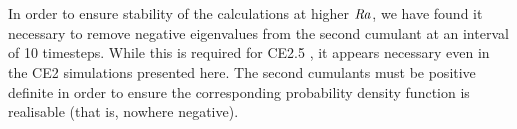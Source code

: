 \documentclass{jfm}
\newcommand{\Rayleigh}{\mbox{\textit{Ra}}}  %
\begin{document}
\appendix
\section{}\label{appA}
In order to ensure stability of the calculations at higher $\Rayleigh$, we have found it necessary to remove negative eigenvalues from the second cumulant at an interval of 10 timesteps.
While this is required for CE2.5 \citep{marston_qi_tobias_2019}, it appears necessary even in the CE2 simulations presented here.
The second cumulants must be positive definite in order to ensure the corresponding probability density function is realisable (that is, nowhere negative).




\end{document}
